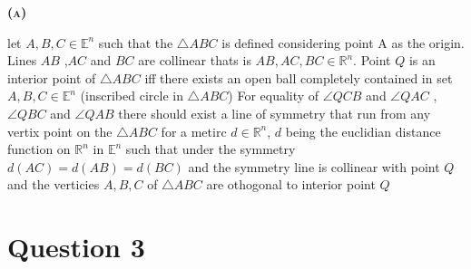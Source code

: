 \documentclass[a4paper, 12pt]{article}
\begin{document}
\begin{center}
    \fontsize{24pt}{10pt}\selectfont
    \textsc{\textbf{(a)}}
\end{center}

let $A,B,C \in \mathbb{E}^n$ such that the $\triangle ABC$ is defined considering point A as the origin.
Lines $AB$ ,$AC$ and $BC$ are collinear thats is $AB ,AC ,BC \in  \mathbb{R}^n$. Point $Q$ is an interior point of $\triangle ABC$
iff there exists an open ball completely contained in set $A,B,C \in \mathbb{E}^n$ (inscribed circle in $\triangle ABC$)
For equality of $\angle QCB$ and $\angle QAC$ , $\angle QBC$ and  $\angle QAB$ there should exist a line of symmetry that run
from any vertix point on the $\triangle ABC$ for a metirc $d \in \mathbb{R}^n$, $d$ 
being the euclidian distance function on $\mathbb{R}^n$  in   $\mathbb{E}^n$ such that under the symmetry $d(AC) = d(AB) = d(BC)$
and the symmetry line is collinear with point $Q$ and the verticies $A ,B ,C$ of $\triangle ABC$ are othogonal to interior point $Q$






\newpage

\section{Question 3}
\end{document}
